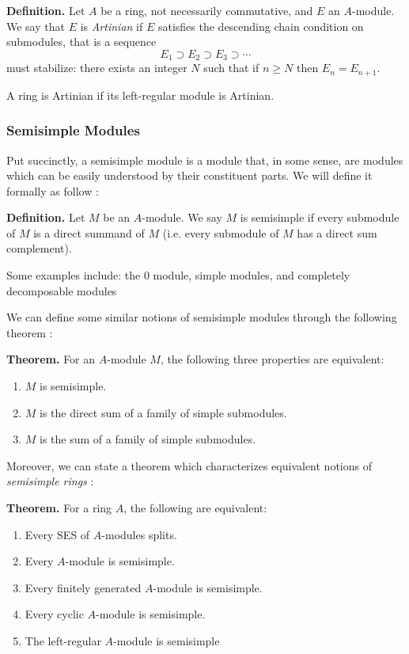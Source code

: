 \documentclass[11pt, reqno]{amsart}
\theoremstyle{plain}
\theoremstyle{definition}
\theoremstyle{example}
\begin{document}
\par
\textbf{Definition.} Let $A$ be a ring, not necessarily commutative, and $E$ an $A$-module. We say that $E$ is \textit{Artinian} if $E$ satisfies the descending chain condition on submodules, that is a sequence $$E_1 \supset E_2 \supset E_3 \supset \cdots$$ must stabilize: there exists an integer $N$ such that if $n \geq N$ then $E_n = E_{n+1}$.

A ring is Artinian if its left-regular module is Artinian.

\subsubsection{Semisimple Modules}

Put succinctly, a semisimple module is a module that, in some sense, are modules which can be easily understood by their constituent parts. We will define it formally as follow \cite[Lec 18, p. 1]{dau}:

\par
\textbf{Definition.} Let $M$ be an $A$-module. We say $M$ is semisimple if every submodule of $M$ is a direct summand of $M$ (i.e. every submodule of $M$ has a direct sum complement).

\par
Some examples include: the $0$ module, simple modules, and completely decomposable modules

\par
We can define some similar notions of semisimple modules through the following theorem \cite[\S 1.2, p. 26]{lam}:

\par
\textbf{Theorem.} For an $A$-module $M$, the following three properties are equivalent:
\begin{enumerate}
\item $M$ is semisimple.

\item $M$ is the direct sum of a family of simple submodules.

\item $M$ is the sum of a family of simple submodules.
\end{enumerate}

\par
Moreover, we can state a theorem which characterizes equivalent notions of \textit{semisimple rings} \cite[\S 1.2, p. 27]{lam}:

\par
\textbf{Theorem.} For a ring $A$, the following are equivalent:
\begin{enumerate}
\item Every SES of $A$-modules splits.

\item Every $A$-module is semisimple.

\item Every finitely generated $A$-module is semisimple.

\item Every cyclic $A$-module is semisimple.

\item The left-regular $A$-module is semisimple
\end{enumerate}
\end{document}
